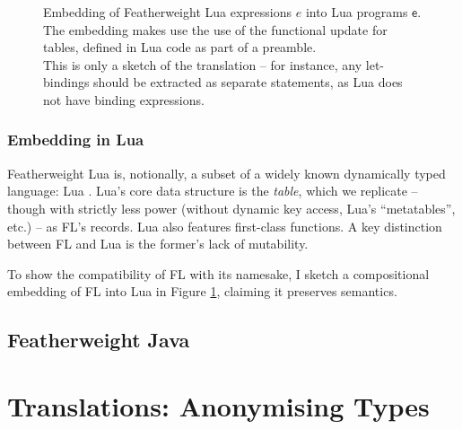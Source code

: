 \newcommand{\lua}[1]{\textsf{#1}}

\begin{figure}
    \centering
    
    \caption{Embedding of Featherweight Lua expressions $e$ into Lua programs $\lua e$. The embedding makes use the use of the functional \textsf{update} for tables, defined in Lua code as part of a preamble. \\
    This is only a sketch of the translation -- for instance, any let-bindings should be extracted as separate statements, as Lua does not have binding expressions.}
    \label{fig:featherweight-lua-embedding}
\end{figure}


\subsubsection{Embedding in Lua}
Featherweight Lua is, notionally, a subset of a widely known dynamically typed language: Lua \cite{lua54}.
Lua's core data structure is the \emph{table}, which we replicate -- though with strictly less power (without dynamic key access, Lua's ``metatables'', etc.) -- as FL's records. 
Lua also features first-class functions.
A key distinction between FL and Lua is the former's lack of mutability. 

To show the compatibility of FL with its namesake, I sketch a compositional embedding of FL into Lua in Figure \ref{fig:featherweight-lua-embedding}, claiming it preserves semantics.

\subsection{Featherweight Java}
\label{subsec:featherweight-java}


\section{Translations: Anonymising Types}
\label{sec:translations}


\newcommand{\fj}[1]{\texttt{#1}}
\newcommand{\fjoverline}[1]{$\overline{\mbox{#1}}$}

\newcommand{\fjconsdef}{\fj{C(\fjoverline{C f}) \{ super($\overline{\fj{f}^*}$); \fjoverline{this.f' = f'';} \}}}
\newcommand{\fjmethdefx}{\fj{C}^* \fj{ m(\fjoverline{C x})\{ ... \}}}
\newcommand{\fjmethdef}{\fj{C}^* \fj{ m(\fjoverline{C x})\{ return e; \}}}
\newcommand{\fjclassdef}{\fj{class C extends C' \{ \fjoverline{C f}; K; \fjoverline{M}; \}}}

